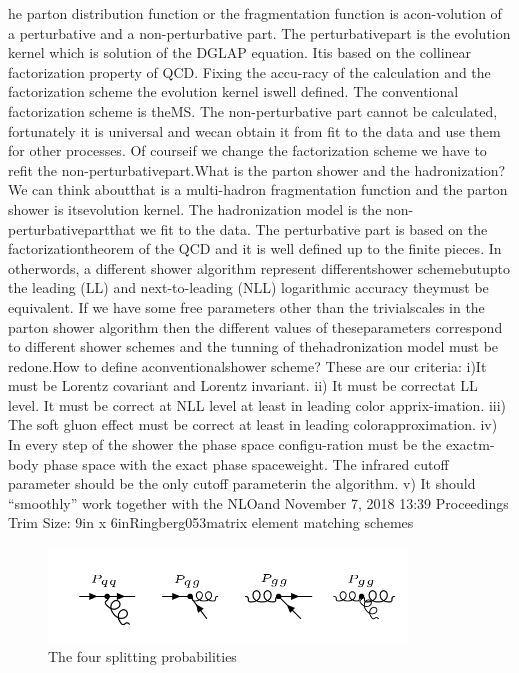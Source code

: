 he parton distribution function or the fragmentation function is acon-volution of a perturbative and a non-perturbative part. The perturbativepart is the evolution kernel which is solution of the DGLAP equation. Itis based on the collinear factorization property of QCD. Fixing the accu-racy of the calculation and the factorization scheme the evolution kernel iswell defined. The conventional factorization scheme is theMS. The non-perturbative part cannot be calculated, fortunately it is universal and wecan obtain it from fit to the data and use them for other processes. Of courseif we change the factorization scheme we have to refit the non-perturbativepart.What is the parton shower and the hadronization? We can think aboutthat is a multi-hadron fragmentation function and the parton shower is itsevolution kernel.  The hadronization model is the non-perturbativepartthat we fit to the data. The perturbative part is based on the factorizationtheorem of the QCD and it is well defined up to the finite pieces. In otherwords, a different shower algorithm represent differentshower schemebutupto the leading (LL) and next-to-leading (NLL) logarithmic accuracy theymust be equivalent. If we have some free parameters other than the trivialscales in the parton shower algorithm then the different values of theseparameters correspond to different shower schemes and the tunning of thehadronization model must be redone.How to define aconventionalshower scheme? These are our criteria: i)It must be Lorentz covariant and Lorentz invariant. ii) It must be correctat LL level. It must be correct at NLL level at least in leading color apprix-imation. iii) The soft gluon effect must be correct at least in leading colorapproximation. iv) In every step of the shower the phase space configu-ration must be the exactm-body phase space with the exact phase spaceweight. The infrared cutoff parameter should be the only cutoff parameterin the algorithm. v) It should “smoothly” work together with the NLOand
November 7, 2018  13:39  Proceedings Trim Size: 9in x 6inRingberg053matrix element matching schemes








\begin{figure}[h!]
\centering
\includegraphics[width=0.85\textwidth]{images/Intro/spiliting.png}
\caption{The four splitting probabilities}
\label{splitting}
\end{figure}

